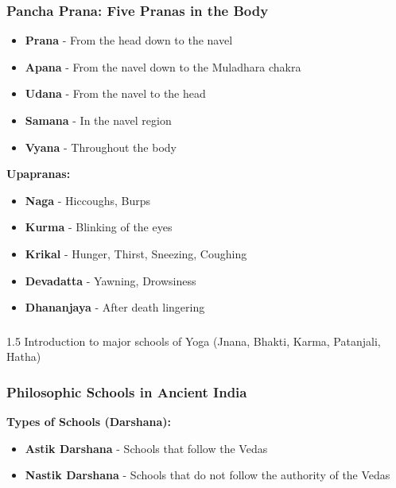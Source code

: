 \begin{frame}[fragile]\frametitle{Pancha Prana: Five Pranas in the Body}
    \begin{itemize}
        \item \textbf{Prana} - From the head down to the navel
        \item \textbf{Apana} - From the navel down to the Muladhara chakra
        \item \textbf{Udana} - From the navel to the head
        \item \textbf{Samana} - In the navel region
        \item \textbf{Vyana} - Throughout the body
    \end{itemize}
    \vspace{0.5cm}
    \textbf{Upapranas:}
    \begin{itemize}
        \item \textbf{Naga} - Hiccoughs, Burps
        \item \textbf{Kurma} - Blinking of the eyes
        \item \textbf{Krikal} - Hunger, Thirst, Sneezing, Coughing
        \item \textbf{Devadatta} - Yawning, Drowsiness
        \item \textbf{Dhananjaya} - After death lingering
    \end{itemize}
\end{frame}






\begin{frame}[fragile]\frametitle{}
\begin{center}
{\Large 1.5 Introduction to major schools of Yoga (Jnana, Bhakti, Karma, Patanjali, Hatha)}
\end{center}
\end{frame}

\begin{frame}[fragile]\frametitle{Philosophic Schools in Ancient India}
    \textbf{Types of Schools (Darshana):}
    \begin{itemize}
        \item \textbf{Astik Darshana} - Schools that follow the Vedas
        \item \textbf{Nastik Darshana} - Schools that do not follow the authority of the Vedas
    \end{itemize}
\end{frame}

